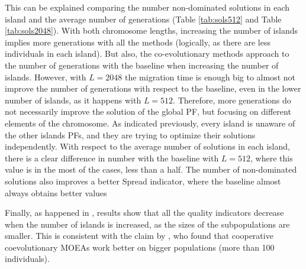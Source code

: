 \documentclass[Afour,sageh,times]{sagej}
\begin{document}
This can be explained comparing the number non-dominated solutions in each island and the average number of generations (Table \ref{tab:sols512} and Table \ref{tab:sols2048}). With both chromosome lengths, increasing the number of islands implies more generations with all the methods (logically, as there are less individuals in each island). But also, the co-evolutionary methods approach to the number of generations with the baseline when increasing the number of islands. However, with $L=2048$ the migration time is enough big to almost not improve the number of generations with respect to the baseline, even in the lower number of islands, as it happens with $L=512$. Therefore, more generations do not necessarily improve the solution of the global PF, but focusing on different elements of the chromosome. As indicated previously, every island is unaware of the other islands PFs, and they are trying to optimize their solutions independently. With respect to the average number of solutions in each island, there is a clear difference in number with the baseline with $L=512$, where this value is in the most of the cases, less than a half. The number of non-dominated solutions also improves a better Spread indicator, where the baseline almost always obtains better values %

Finally, as happened in \citep{Garcia16hpmoon}, results show that all the quality indicators decrease when the number of islands is increased, as the  sizes of the subpopulations are smaller. This is consistent with the claim by \cite{Dorronsoro13superlinear}, who found that cooperative coevolutionary MOEAs work better on bigger populations (more than 100 individuals).





%
\end{document}
